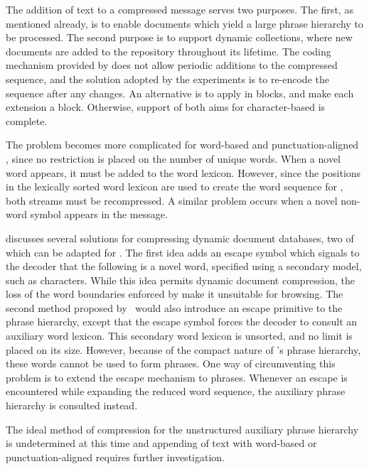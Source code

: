 The addition of text to a compressed message serves two purposes.
The first, as mentioned already, is to enable documents which
yield a large phrase hierarchy to be processed.  The second purpose 
is to support dynamic collections, where new documents 
are added to the repository
throughout its lifetime.  The coding mechanism provided by 
\shuff does not allow periodic additions to the compressed 
sequence, and the solution adopted by the experiments is to 
re-encode the sequence after any changes.  An alternative is to
apply \shuff in blocks, and make each extension a block.
Otherwise, support of
both aims for character-based \repair is complete.

The problem becomes more complicated for word-based and
punctuation-aligned \repair, since no restriction is
placed on the number of unique words.  When a novel word appears,
it must be added to the word lexicon.  However, since the positions in
the lexically sorted word lexicon are used to create the word sequence
for \repair, both streams must be recompressed.  A similar problem occurs
when a novel non-word symbol appears in the message.

\citet{mzs97:tkde}
discusses several solutions for compressing dynamic document databases,
two of which can be adapted for \repair.  The first idea adds an escape
symbol which signals to the decoder that the following is a novel word,
specified using a secondary model, such as characters.  While
this idea permits dynamic document compression, the loss of the word 
boundaries enforced by \prepair make it unsuitable for browsing.
The second method proposed by \citeauthor{mzs97:tkde}\ would also
introduce an escape primitive to the phrase hierarchy, except that 
the escape symbol forces 
the decoder to consult an auxiliary word lexicon.  This secondary word
lexicon is unsorted, and no limit is placed on its size.  However, because
of the compact nature of \repair's phrase hierarchy, these words cannot be
used to form phrases.  One way of circumventing this problem is to extend
the escape mechanism to phrases.
Whenever an escape is encountered while expanding the reduced
word sequence, the auxiliary phrase hierarchy is consulted instead.

The ideal method of compression for the unstructured auxiliary phrase
hierarchy is undetermined at this time and appending of text 
with word-based or punctuation-aligned \repair requires
further investigation.


